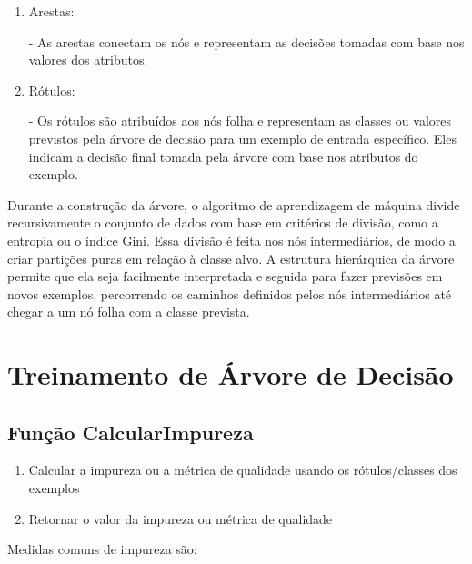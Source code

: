 \documentclass[12pt,a4paper, brazil]{article}
\begin{document}
\begin{enumerate}
    \item Arestas:
     
       - As arestas conectam os nós e representam as decisões tomadas com base nos valores dos atributos. 
    
    \item Rótulos:
    
       - Os rótulos são atribuídos aos nós folha e representam as classes ou valores previstos pela árvore de decisão para um exemplo de entrada específico. Eles indicam a decisão final tomada pela árvore com base nos atributos do exemplo.
    
\end{enumerate}

Durante a construção da árvore, o algoritmo de aprendizagem de máquina divide recursivamente o conjunto de dados com base em critérios de divisão, como a entropia ou o índice Gini. Essa divisão é feita nos nós intermediários, de modo a criar partições puras em relação à classe alvo. A estrutura hierárquica da árvore permite que ela seja facilmente interpretada e seguida para fazer previsões em novos exemplos, percorrendo os caminhos definidos pelos nós intermediários até chegar a um nó folha com a classe prevista.

\section{Treinamento de Árvore de Decisão}

\subsection{Função CalcularImpureza}
\begin{enumerate}
  \item Calcular a impureza ou a métrica de qualidade usando os rótulos/classes dos exemplos
  \item Retornar o valor da impureza ou métrica de qualidade
\end{enumerate}

Medidas comuns de impureza são:
\end{document}
